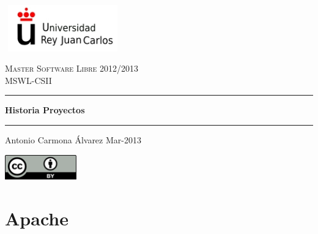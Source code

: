 \documentclass[a4paper,oneside,11pt]{article}
\begin{document}
\vspace{5cm}

\begin{titlepage}
\begin{center}
\includegraphics[width=50mm,height=20mm]{./logo-urjc.jpg}

\vspace{4cm}
\textsc{\Large Master Software Libre 2012/2013}\\[0.5cm]
\textsc{\Large MSWL-CSII}\\[0.5cm]
\hrule height 2pt
\begin{center}
{ \huge \bfseries Historia Proyectos}
\end{center}
\hrule height 2pt
\vspace{0.4cm}
\begin{minipage}{0.4\textwidth}
\large
\begin{center}
Antonio Carmona \'Alvarez Mar-2013
\end{center} 
\end{minipage}
\vfill
\includegraphics[width=3.1cm,height=1.08cm]{./by_petit.png}
{\large}
\end{center}
\end{titlepage}

\newpage
\tableofcontents  %
\newpage

\section{Apache}
\end{document}
